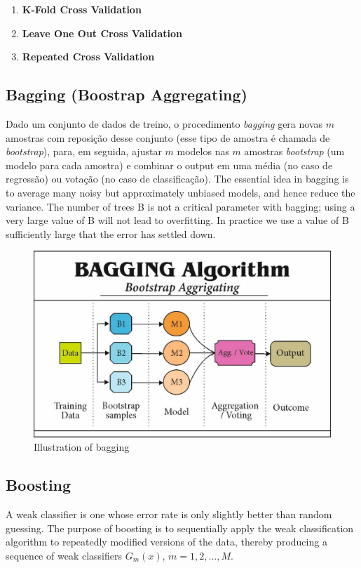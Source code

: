 \begin{enumerate}
    \item \textbf{K-Fold Cross Validation}
    \item \textbf{Leave One Out Cross Validation}
    \item  \textbf{Repeated Cross Validation}
\end{enumerate}

\subsection{Bagging (Boostrap Aggregating)}
Dado um conjunto de dados de treino, o procedimento \textit{bagging} gera novas $m$ amostras com reposição desse conjunto (esse tipo de amostra é chamada de \textit{bootstrap}), para, em seguida, ajustar $m$ modelos nas $m$ amostras \textit{bootstrap} (um modelo para cada amostra) e combinar o output em uma média (no caso de regressão) ou votação (no caso de classificação). The essential idea in bagging is to average many noisy but approximately unbiased models, and hence reduce the variance. The number of trees B is not a critical parameter with bagging; using a very large value of B will not lead to overfitting. In practice we use a value of B sufficiently large that the error has settled down.

\begin{figure}[H]
\centering
\caption{Illustration of bagging}
\includegraphics[scale=0.2]{Figures/bagging.jpg}
\end{figure}


\subsection{Boosting}
A weak classifier is one whose error rate is only slightly better than
random guessing. The purpose of boosting is to sequentially apply the
weak classification algorithm to repeatedly modified versions of the data,
thereby producing a sequence of weak classifiers $G_m(x)$, $m = 1, 2,\dots, M$.

